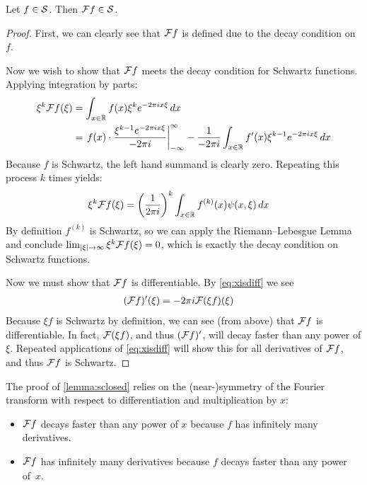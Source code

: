       \begin{lemma}
        \label{lemma:sclosed}
        Let $f\in\S$.
        Then $\F f\in\S$.
        \begin{proof}
          First, we can clearly see that $\F f$ is defined due to the decay condition on $f$.

          Now we wish to show that $\F f$ meets the decay condition for Schwartz functions.
          Applying integration by parts:
          \begin{align*}
            \xi^k\F f(\xi) &= \int_{x\in\R} f(x)\xi^ke^{-2\pi ix\xi}\,dx\\
            &= \left.f(x)\cdot\frac{\xi^{k-1}e^{-2\pi i x\xi}}{-2\pi i}\right|_{-\infty}^\infty - \frac{1}{-2\pi i}\int_{x\in\R} f'(x)\xi^{k-1}e^{-2\pi ix\xi}\,dx
          \end{align*}
          Because $f$ is Schwartz, the left hand summand is clearly zero.
          Repeating this process $k$ times yields:
          \begin{align*}
            \xi^k\F f(\xi) &= \left(\frac{1}{2\pi i}\right)^k \int_{x\in\R}f^{(k)}(x)\psi(x,\xi)\,dx
          \end{align*}
          By definition $f^{(k)}$ is Schwartz, so we can apply the Riemann--Lebesgue Lemma and conclude $\lim_{|\xi|\rightarrow\infty} \xi^k\F f(\xi) = 0$, which is exactly the decay condition on Schwartz functions.

          Now we must show that $\F f$ is differentiable. 
          By \cref{eq:xisdiff} we see
          \begin{align*}
            (\F f)'(\xi) &= -2\pi i \F(\xi f)(\xi)
          \end{align*}
          Because $\xi f$ is Schwartz by definition, we can see (from above) that $\F f$ is differentiable.
          In fact, $\F(\xi f)$, and thus $(\F f)'$, will decay faster than any power of $\xi$.
          Repeated applications of \cref{eq:xisdiff} will show this for all derivatives of $\F f$, and thus $\F f$ is Schwartz.
        \end{proof}
      \end{lemma}
      \begin{rmk}
        The proof of \cref{lemma:sclosed} relies on the (near-)symmetry of the Fourier transform with respect to differentiation and multiplication by $x$:
        \begin{itemize}
          \item $\F f$ decays faster than any power of $x$ because $f$ has infinitely many derivatives.
          \item $\F f$ has infinitely many derivatives because $f$ decays faster than any power of~$x$.
        \end{itemize}
      \end{rmk}

